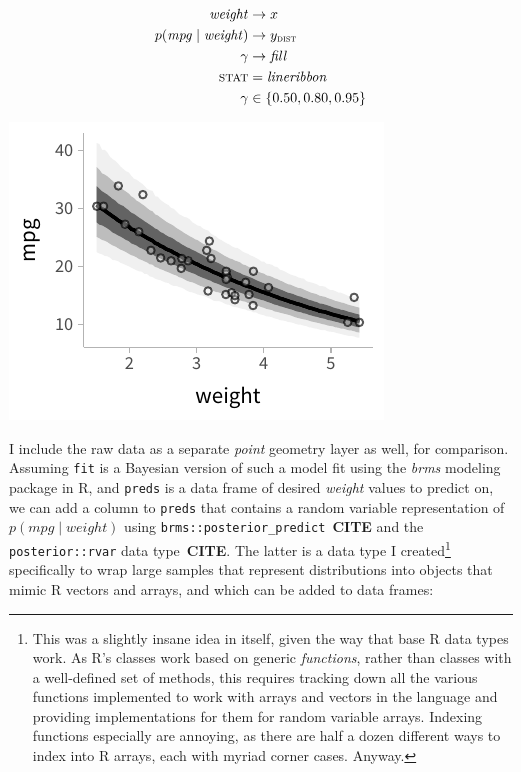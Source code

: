 \documentclass[journal]{vgtc}                     %
\begin{document}
\noindent
\begin{minipage}{.5\columnwidth}

\begin{align*}
\mathit{weight} &\rightarrow x\\
p(\mathit{mpg} \mid \mathit{weight}) &\rightarrow y_\textsc{dist}\\
\gamma &\rightarrow \mathit{fill}\\
\textsc{stat} &= \mathit{lineribbon}\\
\gamma &\in \{0.50, 0.80, 0.95\}
\end{align*}
\end{minipage}%
  \begin{minipage}{.4\columnwidth}
    \centering
    \includegraphics[width=1.2\columnwidth]{figs/3-lineribbon.pdf}
  \end{minipage}
\hfill\break


I include the raw data as a separate \textit{point} geometry layer as well, for comparison. Assuming \texttt{fit}  is a Bayesian version of such a model fit using the \textit{brms} modeling package in R, and \texttt{preds} is a data frame of desired \textit{weight} values to predict on, we can add a column to \texttt{preds} that contains a random variable representation of $p(\mathit{mpg} \mid \mathit{weight})$ using \texttt{brms::posterior\_predict}~\textbf{CITE} and the \texttt{posterior::rvar}  data type~\textbf{CITE}. The latter is a data type I created\footnote{This was a slightly insane idea in itself, given the way that base R data types work. As R's classes work based on generic \textit{functions}, rather than classes with a well-defined set of methods, this requires tracking down all the various functions implemented to work with arrays and vectors in the language and providing implementations for them for random variable arrays. Indexing functions especially are annoying, as there are half a dozen different ways to index into R arrays, each with myriad corner cases. Anyway.} specifically to wrap large samples that represent distributions into objects that mimic R vectors and arrays, and which can be added to data frames:
\end{document}
